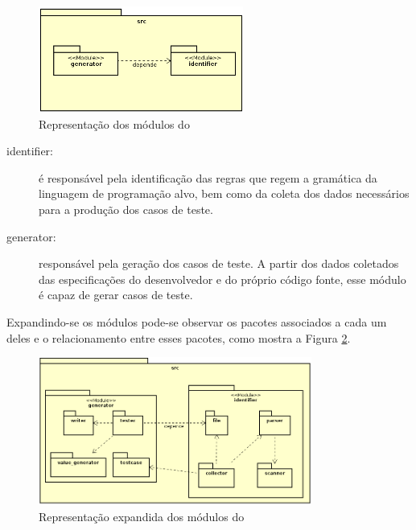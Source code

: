 \begin{figure}[h]
  \centering
    \includegraphics[width=0.6\textwidth]{figuras/modules-scarefault.png}
    \caption{Representação dos módulos do \Scarefault}
    \label{modules-scarefault}
\end{figure}
\FloatBarrier

\begin{description}
\item[identifier:] é responsável pela identificação das regras que regem
a gramática da linguagem de programação alvo, bem como da coleta dos dados
necessários para a produção dos casos de teste.
\item[generator:] responsável pela geração dos casos de teste. A partir dos dados
coletados das especificações do desenvolvedor e do próprio código fonte, esse
módulo é capaz de gerar casos de teste.
\end{description}

Expandindo-se os módulos pode-se observar os pacotes associados a cada um deles
e o relacionamento entre esses pacotes, como mostra a Figura
\ref{expand-modules-scarefault-1}.

\begin{figure}[h]
  \centering
    \includegraphics[width=0.8\textwidth]{figuras/expand-modules-scarefault-1.png}
    \caption{Representação expandida dos módulos do \Scarefault}
    \label{expand-modules-scarefault-1}
\end{figure}

